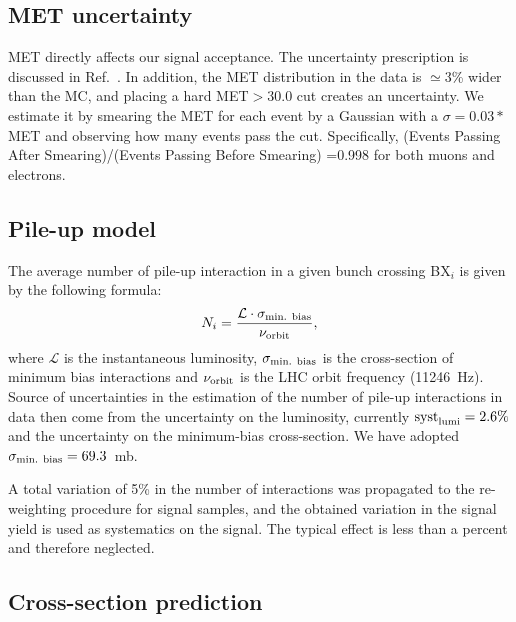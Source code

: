 \subsection{MET uncertainty}

MET directly affects our signal acceptance. 
The uncertainty prescription is discussed in Ref.~\cite{met}.
In addition, the MET distribution in the data is $\simeq$3\% wider 
than the MC, and placing a hard MET$>30.0$ cut creates an uncertainty. 
We estimate it by smearing the MET for each event by a Gaussian with 
a $\sigma =0.03*$MET and observing how many events pass the cut. 
Specifically, (Events Passing After Smearing)/(Events Passing Before Smearing) 
=0.998 for both muons and electrons.


\subsection{Pile-up model}


The average number of pile-up interaction in a given bunch crossing
BX$_{i}$ is given by the following formula:
\begin{equation}
N_{i} = \frac{\mathcal{L} \cdot \sigma_{\textnormal{min. bias}}}{\nu_{\textnormal{orbit}}},
\end{equation}
where $\mathcal{L}$ is the instantaneous luminosity,
$\sigma_{\textnormal{min. bias}}$ is the cross-section of minimum bias
interactions and $\nu_{\textnormal{orbit}}$ is the LHC orbit frequency
(11246~Hz).  Source of uncertainties in the estimation of the number
of pile-up interactions in data then come from the uncertainty on the
luminosity, currently $\textnormal{syst}_{\textnormal{lumi}}=2.6\%$ and
the uncertainty on the minimum-bias cross-section. We have adopted
$\sigma_{\textnormal{min. bias}}=69.3$~mb.

A total variation of 5\% in the number of interactions was propagated to the
re-weighting procedure for signal samples, and the obtained variation
in the signal yield is used as systematics on the signal. The typical
effect is less than a percent and therefore neglected.


\subsection{Cross-section prediction}


